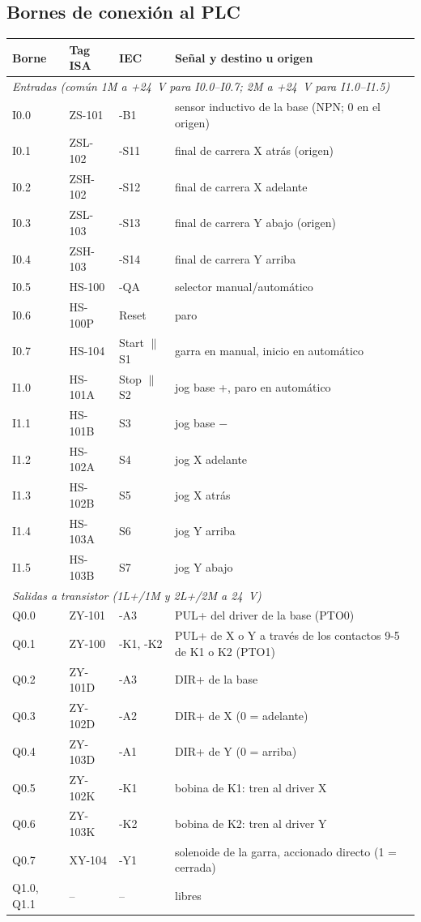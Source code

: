 \documentclass[a4paper,11pt]{article}
\begin{document}
\subsection{Bornes de conexión al PLC}
\begin{center}\small
\begin{longtable}{l l l >{\raggedright\arraybackslash}p{7.2cm}}
\toprule
\textbf{Borne} & \textbf{Tag ISA} & \textbf{IEC} & \textbf{Señal y destino u origen}\\
\midrule\endhead
\multicolumn{4}{l}{\emph{Entradas (común 1M a +24~V para I0.0--I0.7; 2M a +24~V para I1.0--I1.5)}}\\
I0.0 & ZS-101 & -B1 & sensor inductivo de la base (NPN; 0 en el origen)\\
I0.1 & ZSL-102 & -S11 & final de carrera X atrás (origen)\\
I0.2 & ZSH-102 & -S12 & final de carrera X adelante\\
I0.3 & ZSL-103 & -S13 & final de carrera Y abajo (origen)\\
I0.4 & ZSH-103 & -S14 & final de carrera Y arriba\\
I0.5 & HS-100 & -QA & selector manual/automático\\
I0.6 & HS-100P & Reset & paro\\
I0.7 & HS-104 & Start $\parallel$ S1 & garra en manual, inicio en automático\\
I1.0 & HS-101A & Stop $\parallel$ S2 & jog base +, paro en automático\\
I1.1 & HS-101B & S3 & jog base $-$\\
I1.2 & HS-102A & S4 & jog X adelante\\
I1.3 & HS-102B & S5 & jog X atrás\\
I1.4 & HS-103A & S6 & jog Y arriba\\
I1.5 & HS-103B & S7 & jog Y abajo\\
\multicolumn{4}{l}{\emph{Salidas a transistor (1L+/1M y 2L+/2M a 24~V)}}\\
Q0.0 & ZY-101 & -A3 & PUL+ del driver de la base (PTO0)\\
Q0.1 & ZY-100 & -K1, -K2 & PUL+ de X o Y a través de los contactos 9-5 de K1 o K2 (PTO1)\\
Q0.2 & ZY-101D & -A3 & DIR+ de la base\\
Q0.3 & ZY-102D & -A2 & DIR+ de X (0 = adelante)\\
Q0.4 & ZY-103D & -A1 & DIR+ de Y (0 = arriba)\\
Q0.5 & ZY-102K & -K1 & bobina de K1: tren al driver X\\
Q0.6 & ZY-103K & -K2 & bobina de K2: tren al driver Y\\
Q0.7 & XY-104 & -Y1 & solenoide de la garra, accionado directo (1 = cerrada)\\
Q1.0, Q1.1 & -- & -- & libres\\
\bottomrule
\end{longtable}\end{center}
\end{document}
